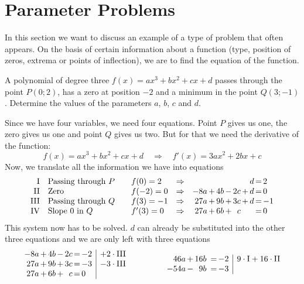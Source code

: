 \documentclass[12pt,eng]{skript_ogg}
\begin{document}
\section{Parameter Problems}
In this section we want to discuss an example of a type of problem that often appears. On the basis of certain information about a function (type, position of zeros, extrema or points of inflection), we are to find the equation of the function.

\begin{beispiel}
A polynomial of degree three $f(x)=ax^3+bx^2+cx+d$ passes through the point  $P(0;2)$, has a zero at position $-2$ and a minimum in the point $Q(3;-1)$. Determine the values of the parameters $a$, $b$, $c$ and $d$.

Since we have four variables, we need four equations. Point $P$ gives us one, the zero gives us one and point $Q$ gives us two. But for that we need the derivative of the function:
\[f(x)=ax^3+bx^2+cx+d\quad\Rightarrow\quad f'(x)=3ax^2+2bx+c\]
Now, we translate all the information we have into equations
\[\begin{array}{rl@{\qquad}lcr@{\,}c@{\,}r@{\,}c@{\,}r@{\,}c@{\,}r@{\,}c@{\,}l}
\mbox{I}   & \mbox{Passing through }P         & f(0)=2  & \Rightarrow & & & & & & & d & = & 2            \\
\mbox{II}  & \mbox{Zero}      & f(-2)=0 & \Rightarrow & -8a & + & 4b & - & 2c & + & d & = & 0  \\
\mbox{III} & \mbox{Passing through }Q         & f(3)=-1 & \Rightarrow & 27a & + & 9b & + & 3c & + & d & = & -1 \\
\mbox{IV}  & \mbox{Slope 0 in }Q & f'(3)=0 & \Rightarrow & 27a & + & 6b & + & c &   &   & = & 0     \\
\end{array}\]
This system now has to be solved. $d$ can already be substituted into the other three equations and we are only left with three equations
\[\begin{array}{r@{\,}c@{\,}r@{\,}c@{\,}r@{\,}c@{\,}l|l}
-8a & + & 4b & - & 2c & = & -2 & +2\cdot\mbox{III}\\
27a & + & 9b & + & 3c & = & -3 & -3\cdot\mbox{III}\\
27a & + & 6b & + & c  & = & 0  & 
\end{array}\qquad\qquad\begin{array}{r@{\,}c@{\,}r@{\,}c@{\,}r@{\,}c@{\,}l|l}
46a  & + & 16b &   &   & = & -2 & 9\cdot\mbox{I}+16\cdot\mbox{II}\\
-54a & - & 9b  &   &   & = & -3 & \\

\end{array}\]
\end{beispiel}
\end{document}
